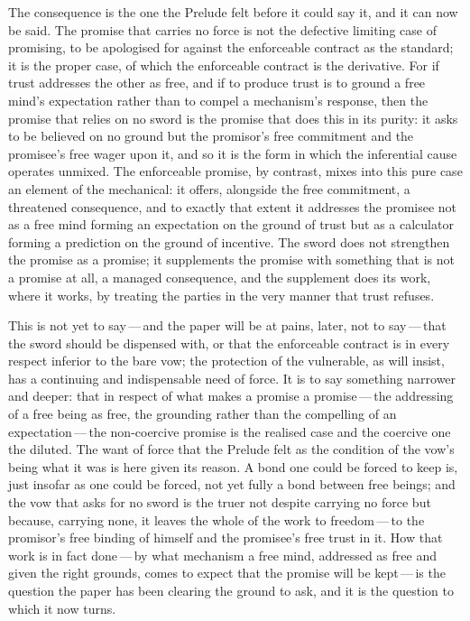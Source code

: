 The consequence is the one the Prelude felt before it could say it, and it can now be said. The promise that carries no force is not the defective limiting case of promising, to be apologised for against the enforceable contract as the standard; it is the proper case, of which the enforceable contract is the derivative. For if trust addresses the other as free, and if to produce trust is to ground a free mind's expectation rather than to compel a mechanism's response, then the promise that relies on no sword is the promise that does this in its purity: it asks to be believed on no ground but the promisor's free commitment and the promisee's free wager upon it, and so it is the form in which the inferential cause operates unmixed. The enforceable promise, by contrast, mixes into this pure case an element of the mechanical: it offers, alongside the free commitment, a threatened consequence, and to exactly that extent it addresses the promisee not as a free mind forming an expectation on the ground of trust but as a calculator forming a prediction on the ground of incentive. The sword does not strengthen the promise as a promise; it supplements the promise with something that is not a promise at all, a managed consequence, and the supplement does its work, where it works, by treating the parties in the very manner that trust refuses.

This is not yet to say\,---\,and the paper will be at pains, later, not to say\,---\,that the sword should be dispensed with, or that the enforceable contract is in every respect inferior to the bare vow; the protection of the vulnerable, as  will insist, has a continuing and indispensable need of force. It is to say something narrower and deeper: that in respect of what makes a promise a promise\,---\,the addressing of a free being as free, the grounding rather than the compelling of an expectation\,---\,the non-coercive promise is the realised case and the coercive one the diluted. The want of force that the Prelude felt as the condition of the vow's being what it was is here given its reason. A bond one could be forced to keep is, just insofar as one could be forced, not yet fully a bond between free beings; and the vow that asks for no sword is the truer not despite carrying no force but because, carrying none, it leaves the whole of the work to freedom\,---\,to the promisor's free binding of himself and the promisee's free trust in it. How that work is in fact done\,---\,by what mechanism a free mind, addressed as free and given the right grounds, comes to expect that the promise will be kept\,---\,is the question the paper has been clearing the ground to ask, and it is the question to which it now turns.
